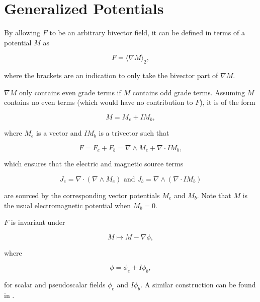 \documentclass{article}
\begin{document}
  \section{Generalized Potentials}

  By allowing $F$ to be an arbitrary bivector field, it can be defined in terms of a potential $M$ as

  \begin{equation}
    F = \langle \nabla M \rangle_2,
  \end{equation}

  where the brackets are an indication to only take the bivector part of $\nabla M$.

  $\nabla M$ only contains even grade terms if $M$ contains odd grade terms. Assuming $M$ contains no even terms (which would have no contribution to $F$), it is of the form

  \begin{equation}
    M = M_e + I M_b, \label{eq:potential}
  \end{equation}

   where $M_e$ is a vector and $I M_b$ is a trivector such that

  \begin{equation}
    F = F_e + F_b = \nabla \wedge M_e + \nabla \cdot I M_b,
  \end{equation}

  which ensures that the electric and magnetic source terms 

  \begin{equation}
    J_e = \nabla \cdot (\nabla \wedge M_e) \text{ and } J_b = \nabla \wedge (\nabla \cdot I M_b)
  \end{equation} 

  are sourced by the corresponding vector potentials $M_e$ and $M_b$. Note that $M$ is the usual electromagnetic potential when $M_b = 0$. 

  $F$ is invariant under

  \begin{equation}
    M \mapsto M - \nabla \phi,
  \end{equation}

  where

  \begin{equation}
    \phi = \phi_e + I \phi_b,
  \end{equation}

  for scalar and pseudoscalar fields $\phi_e$ and $I \phi_b$. A similar construction can be found in \cite{dressel}.
\end{document}
